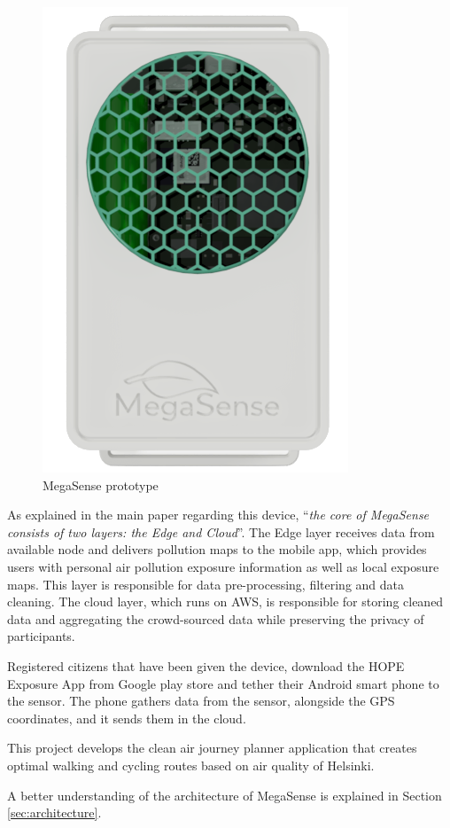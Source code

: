 			\noindent
			\begin{minipage}{0.35\textwidth}
				\begin{figure}[H]
					\centering
					\includegraphics[width=.8\textwidth]{resources/img/chap2/megasense}
					\caption{MegaSense prototype}
					\label{img:megasense_picture}
				\end{figure}
			\end{minipage}%
			\hfill%
			\begin{minipage}{0.65\textwidth}\raggedright
				As explained in the main paper \cite{megasense} regarding this device, ``\textit{the core of MegaSense consists of two layers: the Edge and Cloud}''.
				The Edge layer receives data from available node and delivers pollution maps to the mobile app, which provides users with personal air pollution exposure	information as well as local exposure maps.
				This layer is responsible for data pre-processing, filtering and data cleaning.
				The cloud layer, which runs on AWS, is responsible for storing cleaned data	and aggregating the crowd-sourced data while preserving the privacy of participants.
			\end{minipage}
			\newline

			Registered citizens that have been given the device, download the HOPE Exposure App from Google play store and tether their Android smart phone to the sensor.
			The phone gathers data from the sensor, alongside the GPS coordinates, and it sends them in the cloud.
			
			This project develops the clean air journey	planner application that creates optimal walking and cycling routes based on air quality of Helsinki.
			
			A better understanding of the architecture of MegaSense is explained in Section \ref{sec:architecture}.
